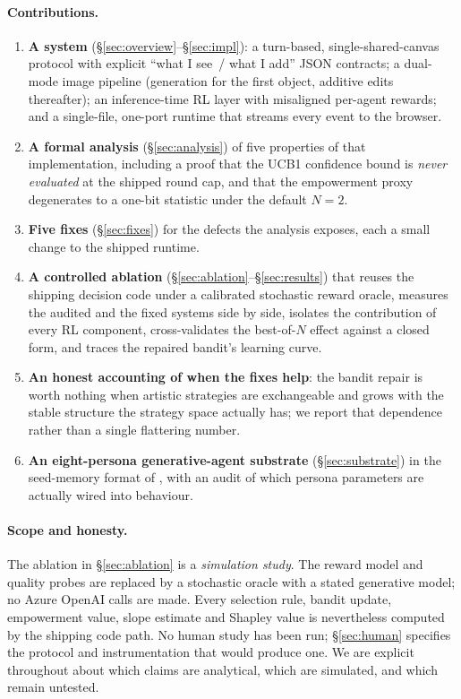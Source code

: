 \documentclass[11pt]{article}
\theoremstyle{plain}
\theoremstyle{definition}
\begin{document}
\paragraph{Contributions.}
\begin{enumerate}[leftmargin=1.3em,itemsep=1pt,topsep=2pt]
\item \textbf{A system} (\S\ref{sec:overview}--\S\ref{sec:impl}): a turn-based,
      single-shared-canvas protocol with explicit ``what I see~/ what I add''
      JSON contracts; a dual-mode image pipeline (generation for the first
      object, additive edits thereafter); an inference-time RL layer with
      misaligned per-agent rewards; and a single-file, one-port runtime that
      streams every event to the browser.
\item \textbf{A formal analysis} (\S\ref{sec:analysis}) of five properties of
      that implementation, including a proof that the UCB1 confidence bound is
      \emph{never evaluated} at the shipped round cap, and that the empowerment
      proxy degenerates to a one-bit statistic under the default $N{=}2$.
\item \textbf{Five fixes} (\S\ref{sec:fixes}) for the defects the analysis
      exposes, each a small change to the shipped runtime.
\item \textbf{A controlled ablation} (\S\ref{sec:ablation}--\S\ref{sec:results})
      that reuses the shipping decision code under a calibrated stochastic
      reward oracle, measures the audited and the fixed systems side by side,
      isolates the contribution of every RL component, cross-validates the
      best-of-$N$ effect against a closed form, and traces the repaired bandit's
      learning curve.
\item \textbf{An honest accounting of when the fixes help}: the bandit repair is
      worth nothing when artistic strategies are exchangeable and grows with the
      stable structure the strategy space actually has; we report that
      dependence rather than a single flattering number.
\item \textbf{An eight-persona generative-agent substrate}
      (\S\ref{sec:substrate}) in the seed-memory format of
      \citet{park2023generative}, with an audit of which persona parameters are
      actually wired into behaviour.
\end{enumerate}

\paragraph{Scope and honesty.}
The ablation in \S\ref{sec:ablation} is a \emph{simulation study}. The reward
model and quality probes are replaced by a stochastic oracle with a stated
generative model; no Azure OpenAI calls are made. Every selection rule, bandit
update, empowerment value, slope estimate and Shapley value is nevertheless
computed by the shipping code path. No human study has been run;
\S\ref{sec:human} specifies the protocol and instrumentation that would produce
one. We are explicit throughout about which claims are analytical, which are
simulated, and which remain untested.
\end{document}
